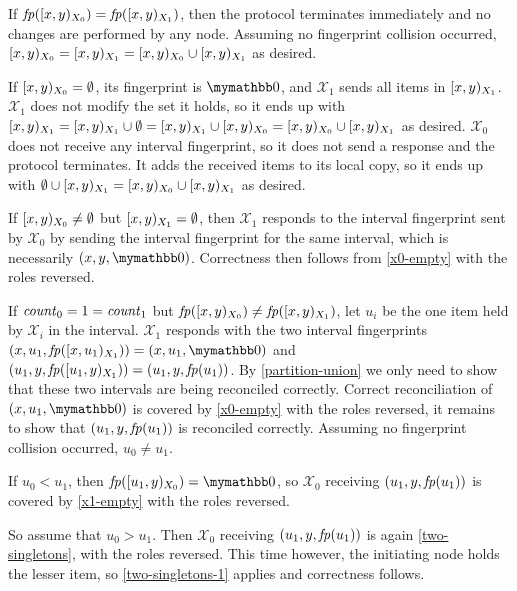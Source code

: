 \begin{caselist}
 \label{fingerprint-eq} If $\mathit{fp}([{x},{y})_{X_0}) = \mathit{fp}([{x},{y})_{X_1})$, then the protocol terminates immediately and no changes are performed by any node. Assuming no fingerprint collision occurred, $[{x},{y})_{X_0} = [{x},{y})_{X_1} = [{x},{y})_{X_0} \cup [{x},{y})_{X_1}$ as desired.

 \label{x0-empty} If $[{x},{y})_{X_0} = \emptyset$, its fingerprint is $\neutraladd$, and $\mathcal{X}_1$ sends all items in $[{x},{y})_{X_1}$. $\mathcal{X}_1$ does not modify the set it holds, so it ends up with $[{x},{y})_{X_1} = [{x},{y})_{X_1} \cup \emptyset = [{x},{y})_{X_1} \cup [{x},{y})_{X_0} = [{x},{y})_{X_0} \cup [{x},{y})_{X_1}$ as desired. $\mathcal{X}_0$ does not receive any interval fingerprint, so it does not send a response and the protocol terminates. It adds the received items to its local copy, so it ends up with $\emptyset \cup [{x},{y})_{X_1} = [{x},{y})_{X_0} \cup [{x},{y})_{X_1}$ as desired.

 \label{x1-empty} If $[{x},{y})_{X_0} \neq \emptyset$ but $[{x},{y})_{X_1} = \emptyset$, then $\mathcal{X}_1$ responds to the interval fingerprint sent by $\mathcal{X}_0$ by sending the interval fingerprint for the same interval, which is necessarily $\ifpmanual{x}{y}{\neutraladd}$. Correctness then follows from \cref{x0-empty} with the roles reversed.

 \label{two-singletons} If $\mathit{count}_{0} = 1 = \mathit{count}_{1}$ but $\mathit{fp}([{x},{y})_{X_0}) \neq \mathit{fp}([{x},{y})_{X_1})$, let $u_i$ be the one item held by $\mathcal{X}_i$ in the interval. $\mathcal{X}_1$ responds with the two interval fingerprints $\ifp{x}{u_1}{X_1} = \ifpmanual{x}{u_1}{\neutraladd}$ and $({u_1}, {y}, {\mathit{fp}([{u_1},{y})_{X_1})}) = ({u_1}, {y}, {\mathit{fp}(u_1)})$. By \cref{partition-union} we only need to show that these two intervals are being reconciled correctly. Correct reconciliation of $\ifpmanual{x}{u_1}{\neutraladd}$ is covered by \cref{x0-empty} with the roles reversed, it remains to show that $({u_1}, {y}, {\mathit{fp}(u_1)})$ is reconciled correctly. Assuming no fingerprint collision occurred, $u_0 \neq u_1$.

\begin{caselist}
\case \label{two-singletons-1}  If $u_0 < u_1$, then $\fp{\interval{u_1}{y}{X_0}} = \neutraladd$, so $\mathcal{X}_0$ receiving $({u_1}, {y}, {\mathit{fp}(u_1)})$ is covered by \cref{x1-empty} with the roles reversed.

\case \label{two-singletons-2} So assume that $u_0 > u_1$. Then $\mathcal{X}_0$ receiving $({u_1}, {y}, {\mathit{fp}(u_1)})$ is again \cref{two-singletons}, with the roles reversed. This time however, the initiating node holds the lesser item, so \cref{two-singletons-1} applies and correctness follows.
\end{caselist}
\end{caselist}

